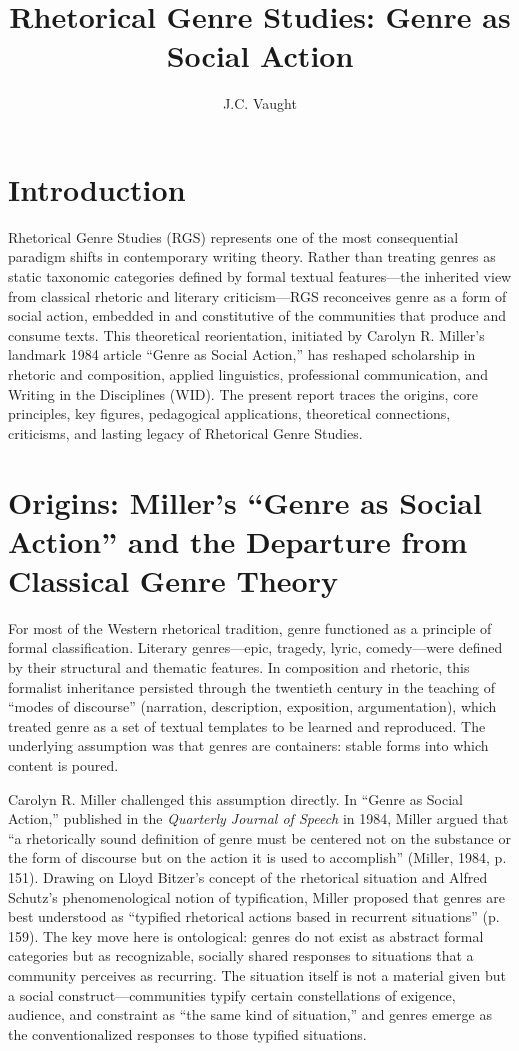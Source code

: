 \documentclass[12pt]{article}
\title{Rhetorical Genre Studies: Genre as Social Action}
\author{J.C. Vaught}
\date{}
\begin{document}
\maketitle

\section{Introduction}

Rhetorical Genre Studies (RGS) represents one of the most consequential paradigm shifts in contemporary writing theory. Rather than treating genres as static taxonomic categories defined by formal textual features---the inherited view from classical rhetoric and literary criticism---RGS reconceives genre as a form of social action, embedded in and constitutive of the communities that produce and consume texts. This theoretical reorientation, initiated by Carolyn R. Miller's landmark 1984 article ``Genre as Social Action,'' has reshaped scholarship in rhetoric and composition, applied linguistics, professional communication, and Writing in the Disciplines (WID). The present report traces the origins, core principles, key figures, pedagogical applications, theoretical connections, criticisms, and lasting legacy of Rhetorical Genre Studies.

\section{Origins: Miller's ``Genre as Social Action'' and the Departure from Classical Genre Theory}

For most of the Western rhetorical tradition, genre functioned as a principle of formal classification. Literary genres---epic, tragedy, lyric, comedy---were defined by their structural and thematic features. In composition and rhetoric, this formalist inheritance persisted through the twentieth century in the teaching of ``modes of discourse'' (narration, description, exposition, argumentation), which treated genre as a set of textual templates to be learned and reproduced. The underlying assumption was that genres are containers: stable forms into which content is poured.

Carolyn R. Miller challenged this assumption directly. In ``Genre as Social Action,'' published in the \textit{Quarterly Journal of Speech} in 1984, Miller argued that ``a rhetorically sound definition of genre must be centered not on the substance or the form of discourse but on the action it is used to accomplish'' (Miller, 1984, p. 151). Drawing on Lloyd Bitzer's concept of the rhetorical situation and Alfred Schutz's phenomenological notion of typification, Miller proposed that genres are best understood as ``typified rhetorical actions based in recurrent situations'' (p. 159). The key move here is ontological: genres do not exist as abstract formal categories but as recognizable, socially shared responses to situations that a community perceives as recurring. The situation itself is not a material given but a social construct---communities typify certain constellations of exigence, audience, and constraint as ``the same kind of situation,'' and genres emerge as the conventionalized responses to those typified situations.
\end{document}
